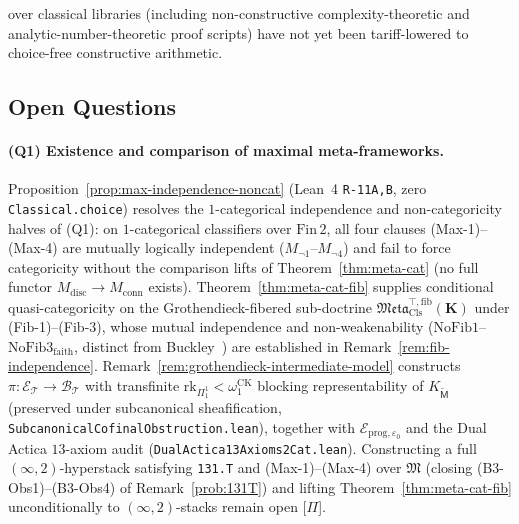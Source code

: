 \documentclass[11pt]{article}
\theoremstyle{plain}
\theoremstyle{definition}
\newcommand{\fM}{\mathfrak{M}}
\newcommand{\Meta}{\mathfrak{Meta}}
\begin{document}
over classical libraries (including non-constructive complexity-theoretic and analytic-number-theoretic proof scripts) have not yet been tariff-lowered to choice-free constructive arithmetic.

\subsection{Open Questions}

\paragraph{(Q1) Existence and comparison of maximal meta-frameworks.} Proposition~\ref{prop:max-independence-noncat} (Lean~4 \texttt{R-11A,B}, zero \texttt{Classical.choice}) resolves the $1$-categorical independence and non-categoricity halves of (Q1): on $1$-categorical classifiers over $\mathrm{Fin}\,2$, all four clauses (Max-1)--(Max-4) are mutually logically independent ($M_{\neg 1}\text{--}M_{\neg 4}$) and fail to force categoricity without the comparison lifts of Theorem~\ref{thm:meta-cat} (no full functor $M_{\mathrm{disc}} \to M_{\mathrm{conn}}$ exists). Theorem~\ref{thm:meta-cat-fib} supplies conditional quasi-categoricity on the Grothendieck-fibered sub-doctrine $\Meta_{\mathrm{Cls}}^{\top,\mathrm{fib}}(\mathbf{K})$ under (Fib-1)--(Fib-3), whose mutual independence and non-weakenability ($\mathrm{NoFib1}$--$\mathrm{NoFib3}_{\mathrm{faith}}$, distinct from Buckley~\cite{Buckley2014}) are established in Remark~\ref{rem:fib-independence}. Remark~\ref{rem:grothendieck-intermediate-model} constructs $\pi : \mathcal{E}_{\mathcal{T}} \to \mathcal{B}_{\mathcal{T}}$ with transfinite $\mathrm{rk}_{\Pi_1^1} < \omega_1^{\mathrm{CK}}$ blocking representability of $K_{\widetilde{\mathsf{M}}}$ (preserved under subcanonical sheafification, \texttt{SubcanonicalCofinalObstruction.lean}), together with $\mathcal{E}_{\mathrm{prog},\varepsilon_0}$ and the Dual Actica $13$-axiom audit (\texttt{DualActica13Axioms2Cat.lean}). Constructing a full $(\infty, 2)$-hyperstack satisfying \texttt{131.T} and (Max-1)--(Max-4) over $\fM$ (closing (B3-Obs1)--(B3-Obs4) of Remark~\ref{prob:131T}) and lifting Theorem~\ref{thm:meta-cat-fib} unconditionally to $(\infty, 2)$-stacks remain open \textup{[\textbf{$\Pi$}]}.
\end{document}
